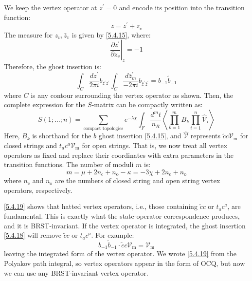 We keep the vertex operator at $z^{\prime}=0$ and encode its position into the transition function:
\begin{equation}
	z=z^{\prime}+z_{v}\label{5.4.16}
\end{equation}
The measure for $z_{v}, \bar{z}_{v}$ is given by \eqref{5.4.15}, where:
\begin{equation}
	\left.\frac{\partial z^{\prime}}{\partial z_{v}}\right|_{z}=-1\label{5.4.17}
\end{equation}
Therefore, the ghost insertion is:
\begin{equation}
	\int_{C} \frac{d z^{\prime}}{2 \pi i} b_{z^{\prime} z^{\prime}} \int_{C} \frac{d \bar{z}_{m}^{\prime}}{-2 \pi i} b_{\bar{z}^{\prime} \bar{z}^{\prime}}=b_{-1} \tilde{b}_{-1}\label{5.4.18}
\end{equation}
where $C$ is any contour surrounding the vertex operator as shown. Then, the complete expression for the $S$-matrix can be compactly written as:
\begin{equation}
	S(1 ; \ldots ; n)=\sum_{\text {compact topologies}} e^{-\lambda \chi} \int_{F} \frac{d^{m} t}{n_{R}}\left\langle\prod_{k=1}^{m} B_{k} \prod_{i=1}^{n} \hat{\mathscr{V}}_{i}\right\rangle\label{5.4.19}
\end{equation}
Here, $B_{k}$ is shorthand for the $b$ ghost insertion \eqref{5.4.15}, and $\hat{\mathscr{V}}$ represents $\tilde{c} c \mathscr{V}_{\mathrm{m}}$ for closed strings and $t_{a} c^{a} \mathscr{V}_{\mathrm{m}}$ for open strings. That is, we now treat all vertex operators as fixed and replace their coordinates with extra parameters in the transition functions. The number of moduli $m$ is:
\begin{equation}
	m=\mu+2 n_{\mathrm{c}}+n_{\mathrm{o}}-\kappa=-3 \chi+2 n_{\mathrm{c}}+n_{\mathrm{o}}
\end{equation}
where $n_{\mathrm{c}}$ and $n_{\mathrm{o}}$ are the numbers of closed string and open string vertex operators, respectively.

\eqref{5.4.19} shows that hatted vertex operators, i.e., those containing $\tilde{c} c$ or $t_{a} c^{a}$, are fundamental. This is exactly what the state-operator correspondence produces, and it is BRST-invariant. If the vertex operator is integrated, the ghost insertion \eqref{5.4.18} will remove $\tilde{c} c$ or $t_{a} c^{a}$. For example:
\begin{equation}
	b_{-1} \tilde{b}_{-1} \cdot \tilde{c} c \mathscr{V}_{\mathrm{m}}=\mathscr{V}_{\mathrm{m}}
\end{equation}
leaving the integrated form of the vertex operator. We wrote \eqref{5.4.19} from the Polyakov path integral, so vertex operators appear in the form of OCQ, but now we can use any BRST-invariant vertex operator.